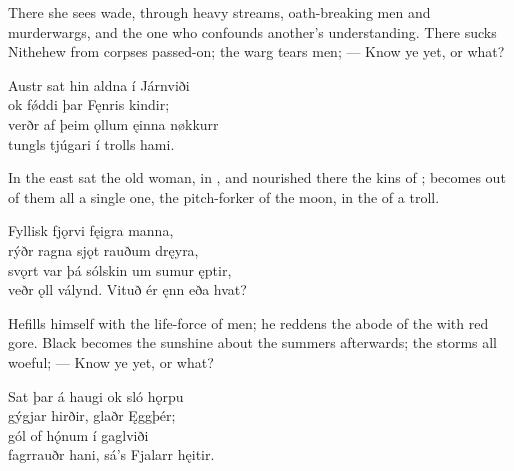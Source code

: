\bvb There she sees wade, through heavy streams, oath-breaking men and murderwargs, and the one who confounds another’s understanding\footnotemark[1]. There sucks Nithehew from corpses passed-on; the warg tears men; — Know ye yet, or what?\evb
{}

\bva Austr sat hin aldna \hld í Járnviði \\%
ok fǿddi þar \hld Fęnris kindir; \\%
verðr af þeim ǫllum \hld ęinna nøkkurr \\%
tungls tjúgari \hld í trolls hami.\eva

\bvb In the east sat the old woman, in , and nourished there the kins of ; becomes out of them all a single one, the pitch-forker of the moon, in the  of a troll.\footnotemark[1]\evb
{}

\bva Fyllisk fjǫrvi \hld fęigra manna, \\%
rýðr ragna sjǫt \hld rauðum dręyra, \\%
svǫrt var þá sólskin \hld um sumur ęptir, \\%
veðr ǫll válynd. \hld Vituð ér ęnn eða hvat?\eva

\bvb He\footnotemark[1] fills himself with the life-force of  men; he reddens the abode of the  with red gore. Black becomes the sunshine about the summers afterwards\footnotemark[2]; the storms all woeful; — Know ye yet, or what?\evb
{}

\bva Sat þar á haugi \hld ok sló hǫrpu \\%
gýgjar hirðir, \hld glaðr Ęggþér; \\%
gól of hǫ́num \hld í gaglviði \\%
fagrrauðr hani, \hld sá’s Fjalarr hęitir.\eva

